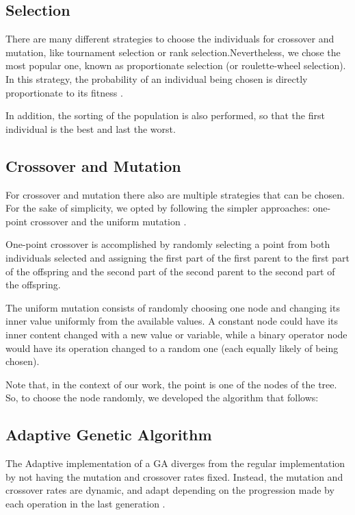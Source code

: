 \documentclass[runningheads]{llncs}
\begin{document}
\subsection{Selection}

There are many different strategies to choose the individuals for crossover and mutation, like tournament selection or rank selection.Nevertheless, we chose the most popular one, known as proportionate selection (or roulette-wheel selection). In this strategy, the probability of an individual being chosen is directly proportionate to its fitness \cite{martins2016gacuda}.

In addition, the sorting of the population is also performed, so that the first individual is the best and last the worst.

\subsection{Crossover and Mutation}

For crossover and mutation there also are multiple strategies that can be chosen. For the sake of simplicity, we opted by following the simpler approaches: one-point crossover and the uniform mutation \cite{martins2016gacuda}.

One-point crossover is accomplished by randomly selecting a point from both individuals selected and assigning the first part of the first parent to the first part of the offspring and the second part of the second parent to the second part of the offspring.

The uniform mutation consists of randomly choosing one node and changing its inner value uniformly from the available values. A constant node could have its inner content changed with a new value or variable, while a binary operator node would have its operation changed to a random one (each equally likely of being chosen).

Note that, in the context of our work, the point is one of the nodes of the tree. So, to choose the node randomly, we developed the algorithm that follows:

\subsection{Adaptive Genetic Algorithm}
The Adaptive implementation of a GA diverges from the regular implementation by not having the mutation and crossover rates fixed. Instead, the mutation and crossover rates are dynamic, and adapt depending on the progression made by each operation in the last generation \cite{adaptativeCrossOverMutation}.
\end{document}
